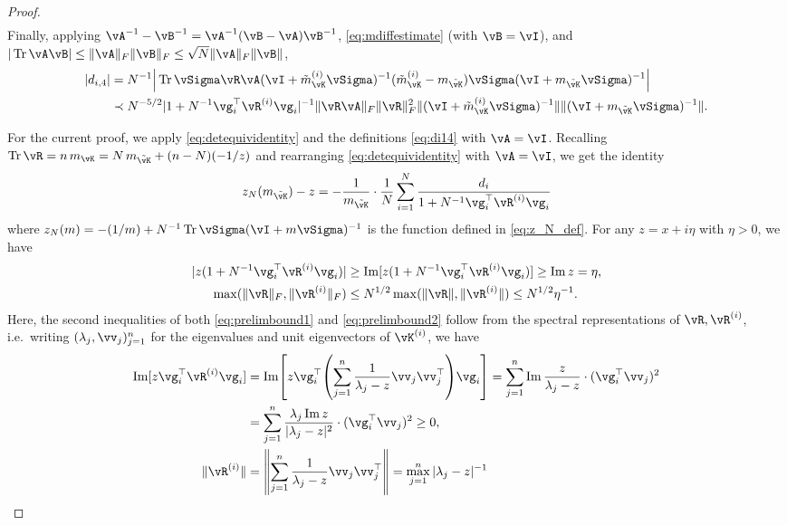 \begin{proof}
\begin{align}
\end{align}
Finally, applying $\vA^{-1}-\vB^{-1}=\vA^{-1}(\vB-\vA)\vB^{-1}$,
\eqref{eq:mdiffestimate} (with $\vB=\vI$), and 
$|\Tr \vA\vB| \leq \|\vA\|_F\|\vB\|_F \leq \sqrt{N} \|\vA\|_F\|\vB\|$,
\begin{align}
|d_{i,4}| &=N^{-1} \Big|\Tr \vSigma \vR\vA
(\vI+\tilde m_{\vK}^{(i)}\vSigma)^{-1} (\tilde m_{\vK}^{(i)}-m_{\tilde \vK})\vSigma
(\vI+m_{\tilde \vK}\vSigma)^{-1}\Big|\nonumber\\
&\prec N^{-5/2} |1+N^{-1}\vg_i^\top \vR^{(i)}\vg_i|^{-1} 
\|\vR\vA\|_F \|\vR\|_F^2
\|(\vI+\tilde m_{\vK}^{(i)}\vSigma)^{-1}\| 
\|(\vI+m_{\tilde \vK}\vSigma)^{-1}\|.\label{eq:di4}
\end{align}

For the current proof, we apply \eqref{eq:detequividentity} and the definitions
\eqref{eq:di14} with $\vA=\vI$.
Recalling $\Tr \vR=n\,m_{\vK}=N\,m_{\tilde \vK}+(n-N)(-1/z)$ and
rearranging \eqref{eq:detequividentity} with $\vA=\vI$, we get the identity
\begin{equation}\label{eq:Deltaidentity}
z_N(m_{\tilde \vK})-z={-}\frac{1}{m_{\tilde \vK}}
\cdot \frac{1}{N}\sum_{i=1}^N \frac{d_i}{1+N^{-1}\vg_i^\top
\vR^{(i)}\vg_i}
\end{equation}
where $z_N(m)=-(1/m)+N^{-1}\Tr \vSigma(\vI+m\vSigma)^{-1}$ is the function
defined in \eqref{eq:z_N_def}. For any $z=x+i\eta$ with $\eta>0$, we have
\begin{align}
|z(1+N^{-1}\vg_i^\top \vR^{(i)}\vg_i)|
&\geq \Im [z(1+N^{-1}\vg_i^\top \vR^{(i)}\vg_i)] \geq \Im z=\eta,
\label{eq:prelimbound1}\\
\max(\|\vR\|_F,\|\vR^{(i)}\|_F) &\leq N^{1/2}\max(\|\vR\|,\|\vR^{(i)}\|)
\leq N^{1/2}\eta^{-1}.\label{eq:prelimbound2}
\end{align}
Here, the second inequalities of both \eqref{eq:prelimbound1} and
\eqref{eq:prelimbound2} follow from the spectral representations of
$\vR,\vR^{(i)}$, i.e.\ writing $(\lambda_j,\vv_j)_{j=1}^n$ for the
eigenvalues and unit eigenvectors of $\vK^{(i)}$, we have
\begin{align*}
\Im [z\vg_i^\top \vR^{(i)}\vg_i]
&=\Im \left[z \vg_i^\top\left(\sum_{j=1}^n
\frac{1}{\lambda_j-z}\vv_j\vv_j^\top\right)
\vg_i\right]
=\sum_{j=1}^n \Im \frac{z}{\lambda_j-z} \cdot (\vg_i^\top \vv_j)^2\\
&=\sum_{j=1}^n \frac{\lambda_j \Im z}{|\lambda_j-z|^2} \cdot (\vg_i^\top \vv_j)^2
\geq 0,\\
\|\vR^{(i)}\|&=\left\|\sum_{j=1}^n
\frac{1}{\lambda_j-z}\vv_j\vv_j^\top\right\|=\max_{j=1}^n |\lambda_j-z|^{-1}

\end{align*}
\end{proof}
